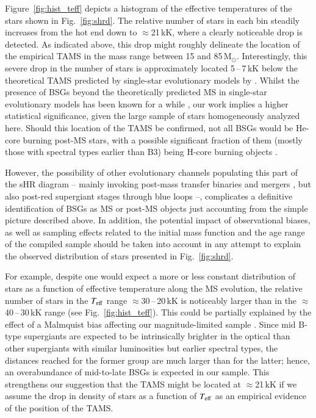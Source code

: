 \documentclass{aa}
\newcommand{\Teff}{\mbox{$T_{\rm eff}$}\xspace}
\newcommand{\MSol}{\,\mbox{M$_\odot$}\xspace}
\begin{document}
Figure~\ref{fig:hist_teff} depicts a histogram of the effective temperatures of the stars shown in Fig.~\ref{fig:shrd}. The relative number of stars in each bin steadily increases from the hot end down to $\approx$21\,kK, where a clearly noticeable drop is detected. As indicated above, this drop might roughly delineate the location of the empirical TAMS in the mass range between 15 and 85\MSol. Interestingly, this severe drop in the number of stars is approximately located 5\,--\,7\,kK below the theoretical TAMS predicted by single-star evolutionary models by \citet{ekstrom12}. Whilst the presence of BSGs beyond the theoretically predicted MS in single-star evolutionary models has been known for a while \citep[see, for example,][using photometric and spectroscopic observations, respectively]{fitzpatrick90, castro14}, our work implies a higher statistical significance, given the large sample of stars homogeneously analyzed here. Should this location of the TAMS be confirmed, not all BSGs would be He-core burning post-MS stars, with a possible significant fraction of them (mostly those with spectral types earlier than B3) being H-core burning objects \citep[see also previous hints by][]{vink10, brott11, castro14, mcevoy15}.

However, the possibility of other evolutionary channels populating this part of the sHR diagram -- mainly invoking post-mass transfer binaries and mergers \citep[see][and references therein]{marchant23}, but also post-red supergiant stages through blue loops \citep[e.g.][]{stothers75, martinet21, zhao23} --, complicates a definitive identification of BSGs as MS or post-MS objects just accounting from the simple picture described above. In addition, the potential impact of observational biases, as well as sampling effects related to the initial mass function and the age range of the compiled sample should be taken into account in any attempt to explain the observed distribution of stars presented in Fig.~\ref{fig:shrd}.

For example, despite one would expect a more or less constant distribution of stars as a function of effective temperature along the MS evolution, the relative number of stars in the \Teff range $\approx$30\,--\,20\,kK is noticeably larger than in the $\approx$40\,--\,30\,kK range (see Fig.~\ref{fig:hist_teff}). This could be partially explained by the effect of a Malmquist bias affecting our magnitude-limited sample \citep[see][for a detailed discussion]{deburgos23}. Since mid B-type supergiants are expected to be intrinsically brighter in the optical than other supergiants with similar luminosities but earlier spectral types, the distances reached for the former group are much larger than for the latter; hence, an overabundance of mid-to-late BSGs is expected in our sample. This strengthens our suggestion that the TAMS might be located at $\approx$21\,kK if we assume the drop in density of stars as a function of \Teff as an empirical evidence of the position of the TAMS.
\end{document}
